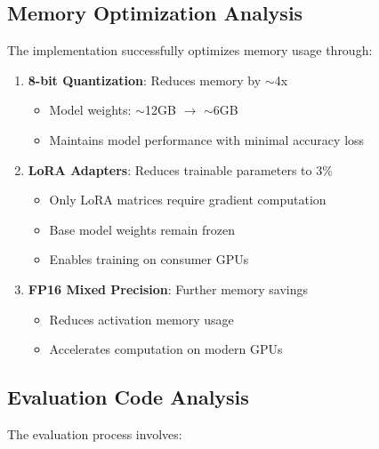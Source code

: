 \documentclass[conference]{IEEEtran}
\begin{document}
\subsection{Memory Optimization Analysis}

The implementation successfully optimizes memory usage through:

\begin{enumerate}
    \item \textbf{8-bit Quantization}: Reduces memory by $\sim$4x
    \begin{itemize}
        \item Model weights: $\sim$12GB $\rightarrow$ $\sim$6GB
        \item Maintains model performance with minimal accuracy loss
    \end{itemize}
    
    \item \textbf{LoRA Adapters}: Reduces trainable parameters to 3\%
    \begin{itemize}
        \item Only LoRA matrices require gradient computation
        \item Base model weights remain frozen
        \item Enables training on consumer GPUs
    \end{itemize}
    
    \item \textbf{FP16 Mixed Precision}: Further memory savings
    \begin{itemize}
        \item Reduces activation memory usage
        \item Accelerates computation on modern GPUs
    \end{itemize}
\end{enumerate}

\subsection{Evaluation Code Analysis}

The evaluation process involves:
\end{document}
